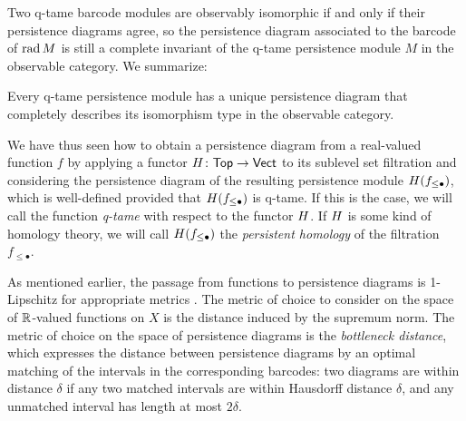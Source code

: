 Two q-tame barcode modules are observably isomorphic if and only if their persistence diagrams agree, so the persistence diagram associated to the barcode of $\operatorname{rad} M$ is still a complete invariant of the q-tame persistence module $M$ in the observable category.
We summarize:

\begin{thm} \label{thm:q-tame modules have barcodes}
    Every q-tame persistence module has a unique persistence diagram that completely describes its isomorphism type in the observable category.
\end{thm}

We have thus seen how to obtain a persistence diagram from a real-valued function $f$ by applying a functor $H \colon \mathsf{Top} \to \mathsf{Vect}$ to its sublevel set filtration and considering the persistence diagram of the resulting persistence module $H(f_{\leq \bullet})$, which is well-defined provided that $H(f_{\leq \bullet})$ is q-tame.
If this is the case, we will call the function \emph{q-tame} with respect to the functor $H$.
If $H$ is some kind of homology theory, we will call $H(f_{\leq \bullet})$ the \emph{persistent homology} of the filtration $f_{\leq \bullet}$.

As mentioned earlier, the passage from functions to persistence diagrams is 1-Lipschitz for appropriate metrics \cite{MR3333456}.
The metric of choice to consider on the space of $\mathbb{R}$-valued functions on $X$ is the distance induced by the supremum norm.
The metric of choice on the space of persistence diagrams is the \emph{bottleneck distance}, which expresses the distance between persistence diagrams by an optimal matching of the intervals in the corresponding barcodes: two diagrams are within distance $\delta$ if any two matched intervals are within Hausdorff distance $\delta$, and any unmatched interval has length at most $2\delta$.


